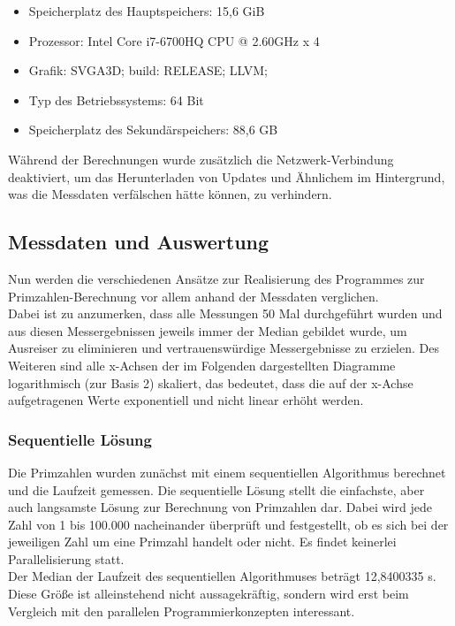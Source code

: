 			\begin{itemize}
				\item Speicherplatz des Hauptspeichers: 15,6 GiB
				\item Prozessor: Intel Core i7-6700HQ CPU @ 2.60GHz x 4
				\item Grafik: SVGA3D; build: RELEASE;  LLVM;
				\item Typ des Betriebssystems: 64 Bit
				\item Speicherplatz des Sekundärspeichers: 88,6 GB
			\end{itemize}
		
			Während der Berechnungen wurde zusätzlich die Netzwerk-Verbindung deaktiviert, um das Herunterladen von Updates und Ähnlichem im Hintergrund, was die Messdaten verfälschen hätte können, zu verhindern.
		
		\subsection{Messdaten und Auswertung}
		
			Nun werden die verschiedenen Ansätze zur Realisierung des Programmes zur Primzahlen-Berechnung vor allem anhand der Messdaten verglichen.\\
			Dabei ist zu anzumerken, dass alle Messungen 50 Mal durchgeführt wurden und aus diesen Messergebnissen jeweils immer der Median gebildet wurde, um Ausreiser zu eliminieren und vertrauenswürdige Messergebnisse zu erzielen. Des Weiteren sind alle x-Achsen der im Folgenden dargestellten Diagramme logarithmisch (zur Basis 2) skaliert, das bedeutet, dass die auf der x-Achse aufgetragenen Werte exponentiell und nicht linear erhöht werden.\\
		
			\subsubsection{Sequentielle Lösung}
				Die Primzahlen wurden zunächst mit einem sequentiellen Algorithmus berechnet und die Laufzeit gemessen. Die sequentielle Lösung stellt die einfachste, aber auch langsamste Lösung zur Berechnung von Primzahlen dar. Dabei wird jede Zahl von 1 bis 100.000 nacheinander überprüft und festgestellt, ob es sich bei der jeweiligen Zahl um eine Primzahl handelt oder nicht. Es findet keinerlei Parallelisierung statt.\\
				Der Median der Laufzeit des sequentiellen Algorithmuses beträgt 12,8400335 s. Diese Größe ist alleinstehend nicht aussagekräftig, sondern wird erst beim Vergleich mit den parallelen Programmierkonzepten interessant.
			
